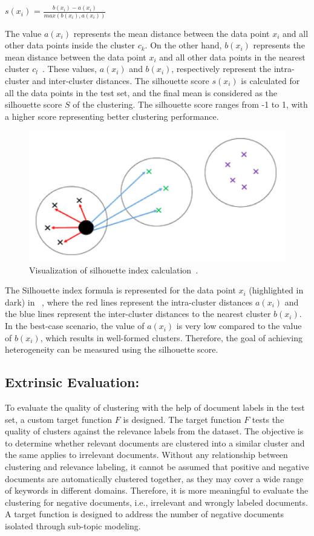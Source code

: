 		\centerline{$s(x_i)$ = $\frac{b(x_i) - a(x_i)}{max(b(x_i), a(x_i))} $}
		
The value $a(x_i)$ represents the mean distance between the data point $x_i$ and all other data points inside the cluster $c_k$. On the other hand, $b(x_i)$ represents the mean distance between the data point $x_i$ and all other data points in the nearest cluster $c_l$~\cite{shutaywi2021silhouette}. These values, $a(x_i)$ and $b(x_i)$, respectively represent the intra-cluster and inter-cluster distances. The silhouette score $s(x_i)$ is calculated for all the data points in the test set, and the final mean is considered as the silhouette score $S$ of the clustering. The silhouette score ranges from -1 to 1, with a higher score representing better clustering performance.

		
		\begin{figure}[h]
			\centering
			\includegraphics[width=.7\textwidth]{images/papers/silhouette_index.png}
			\caption{Visualization of silhouette index calculation~\cite{shutaywi2021silhouette}.  \label{fig:silhouette_index}}
		\end{figure}
	
The Silhouette index formula is represented for the data point $x_i$ (highlighted in dark) in ~, where the red lines represent the intra-cluster distances $a(x_i)$ and the blue lines represent the inter-cluster distances to the nearest cluster $b(x_i)$. In the best-case scenario, the value of $a(x_i)$ is very low compared to the value of $b(x_i)$, which results in well-formed clusters. Therefore, the goal of achieving heterogeneity can be measured using the silhouette score.

	
		\subsection{Extrinsic Evaluation:} To evaluate the quality of clustering with the help of document labels in the test set, a custom target function $F$ is designed. The target function $F$ tests the quality of clusters against the relevance labels from the dataset. The objective is to determine whether relevant documents are clustered into a similar cluster and the same applies to irrelevant documents. Without any relationship between clustering and relevance labeling, it cannot be assumed that positive and negative documents are automatically clustered together, as they may cover a wide range of keywords in different domains. Therefore, it is more meaningful to evaluate the clustering for negative documents, i.e., irrelevant and wrongly labeled documents. A target function is designed to address the number of negative documents isolated through sub-topic modeling.
		

